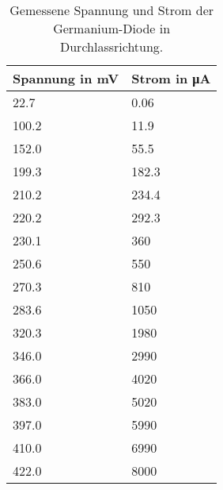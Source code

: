 \documentclass[
12pt,
a4paper,
bibliography=totocnumbered, %
BCOR=1cm, %
oneside, %
]{scrartcl}
\begin{document}
\begin{table}[H]
	\centering %
	\caption{Gemessene Spannung und Strom der Germanium-Diode in Durchlassrichtung.\label{tbl:GeDiode}}
	\begin{tabular}{ll}
		\toprule
		Spannung in \si{\milli\volt} & Strom in \si{\micro\ampere} \\
		\midrule
		\num{22,7}  & \num{0,06}  \\
		\num{100,2} & \num{11,9}  \\
		\num{152,0} & \num{55,5}  \\
		\num{199,3} & \num{182,3} \\
		\num{210,2} & \num{234,4} \\
		\num{220,2} & \num{292,3} \\
		\num{230,1} & \num{360}   \\
		\num{250,6} & \num{550}   \\
		\num{270,3} & \num{810}   \\
		\num{283,6} & \num{1050}  \\
		\num{320,3} & \num{1980}  \\
		\num{346,0} & \num{2990}  \\
		\num{366,0} & \num{4020}  \\
		\num{383,0} & \num{5020}  \\
		\num{397,0} & \num{5990}  \\
		\num{410,0} & \num{6990}  \\
		\num{422,0} & \num{8000}  \\
		\bottomrule
	\end{tabular}
\end{table}
\end{document}
